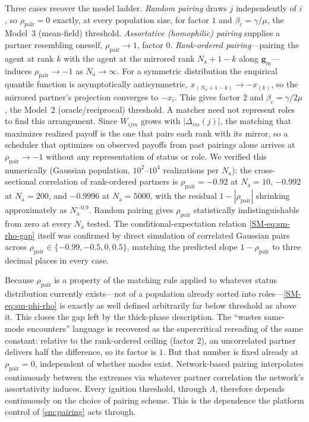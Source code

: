 \documentclass[
  aps,prx,
  preprint,
  superscriptaddress,
  nofootinbib
]{revtex4-2}
\newcommand{\g}{\mathbf{g}}
\newcommand{\Nag}{N_{\mathrm{a}}}
\begin{document}
Three cases recover the model ladder. \emph{Random pairing} draws $j$ independently of $i$, so $\rho_{\mathrm{pair}}=0$ exactly, at every population size, for factor $1$ and $\beta_c=\gamma/\mu$, the Model~3 (mean-field) threshold. \emph{Assortative (homophilic) pairing} supplies a partner resembling oneself, $\rho_{\mathrm{pair}}\to1$, factor $0$. \emph{Rank-ordered pairing}---pairing the agent at rank $k$ with the agent at the mirrored rank $\Nag+1-k$ along $\g_m$---induces $\rho_{\mathrm{pair}}\to-1$ as $\Nag\to\infty$. For a symmetric distribution the empirical quantile function is asymptotically antisymmetric, $x_{(\Nag+1-k)}\to -x_{(k)}$, so the mirrored partner's projection converges to $-x_i$. This gives factor $2$ and $\beta_c=\gamma/2\mu$, the Model~2 (oracle/reciprocal) threshold. A matcher need not represent roles to find this arrangement. Since $W_{ijm}$ grows with $|\Delta_{im}(j)|$, the matching that maximizes realized payoff is the one that pairs each rank with its mirror, so a scheduler that optimizes on observed payoffs from past pairings alone arrives at $\rho_{\mathrm{pair}}\to-1$ without any representation of status or role. We verified this numerically (Gaussian population, $10^2$--$10^4$ realizations per $\Nag$): the cross-sectional correlation of rank-ordered partners is $\rho_{\mathrm{pair}}=-0.92$ at $\Nag=10$, $-0.992$ at $\Nag=200$, and $-0.9996$ at $\Nag=5000$, with the residual $1-|\rho_{\mathrm{pair}}|$ shrinking approximately as $\Nag^{-0.9}$. Random pairing gives $\rho_{\mathrm{pair}}$ statistically indistinguishable from zero at every $\Nag$ tested. The conditional-expectation relation \cref{SM-eq:sm-rho-gap} itself was confirmed by direct simulation of correlated Gaussian pairs across $\rho_{\mathrm{pair}}\in\{-0.99,-0.5,0,0.5\}$, matching the predicted slope $1-\rho_{\mathrm{pair}}$ to three decimal places in every case.

Because $\rho_{\mathrm{pair}}$ is a property of the matching rule applied to whatever status distribution currently exists---not of a population already sorted into roles---\cref{SM-eq:sm-phi-rho} is exactly as well defined arbitrarily far below threshold as above it. This closes the gap left by the thick-phase description. The ``wastes same-mode encounters'' language is recovered as the supercritical rereading of the same constant: relative to the rank-ordered ceiling (factor $2$), an uncorrelated partner delivers half the difference, so its factor is $1$. But that number is fixed already at $\rho_{\mathrm{pair}}=0$, independent of whether modes exist. Network-based pairing interpolates continuously between the extremes via whatever partner correlation the network's assortativity induces. Every ignition threshold, through $\Lambda$, therefore depends continuously on the choice of pairing scheme. This is the dependence the platform control of \cref{sm:pairing} acts through.
\end{document}
